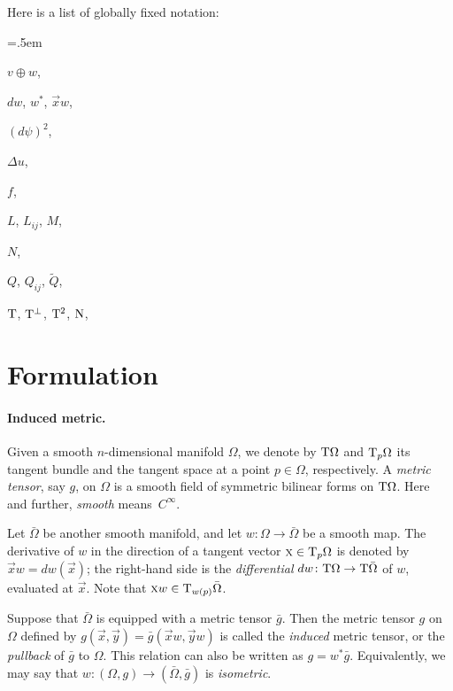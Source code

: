 Here is a list of globally fixed notation:
\footnotesize
\begin{list}{}{\leftmargin=.5em}
\item $v\oplus w$, \pageref{oplus}
\item $dw$, $w^*$, $\vec x w$, \pageref{dw}
\item $(d\psi)^2$, \pageref{d2}
\item $\Delta u$, \pageref{Du}
\item $f$, \pageref{f}
\item $L$, $L_{ij}$, $M$, 
\item $N$, \pageref{Nn}
\item $Q$, $Q_{ij}$, $\tilde Q$, 
\item $\mathrm{T}$, $\mathrm{T}^\perp$, $\mathrm{T}^2$, $\operatorname{\rm N}$, \pageref{TTTN}
\end{list}
\spell{\end{multicols}}{}


\section{Formulation}\label{sec1}

\paragraph{Induced metric.}
Given a smooth $n$-dimensional manifold $\Omega$, we denote by $\mathrm{T}\Omega$ and $\mathrm{T}_p\Omega$
its tangent bundle and the tangent space at a point $p \in \Omega$, respectively. \label{T}
A \emph{metric tensor}, say $g$, on $\Omega$ is a smooth field of symmetric bilinear forms on $\mathrm{T}\Omega$.
Here and further, \emph{smooth} means~$C^\infty$.

Let $\bar\Omega$ be another smooth manifold, and let $w\colon\Omega \to \bar\Omega$ be a smooth map.
The derivative of $w$ in the direction of a tangent vector $\text{\rm \textsc{x}} \in \mathrm{T}_p\Omega$ is denoted by \label{dw} $\vec x w = dw(\vec x)$;
the right-hand side is the \emph{differential} $dw\colon\mathrm{T}\Omega \to \mathrm{T}\bar\Omega$ of $w$, evaluated at $\vec x$.
Note that $\text{\rm \textsc{x}} w \in \mathrm{T}_{w(p)}\bar\Omega$.

Suppose that $\bar\Omega$ is equipped with a metric tensor $\bar g$.
Then the metric tensor $g$ on $\Omega$ defined by
$g(\vec x, \vec y) = \bar g(\vec x w, \vec y w)$
is called the \emph{induced} metric tensor, or the \emph{pullback} of $\bar g$ to $\Omega$.
This relation can also be written as $g = w^*\bar g$.
Equivalently, we may say that $w\colon(\Omega, g)\to(\bar\Omega, \bar g)$ is \emph{isometric}.

